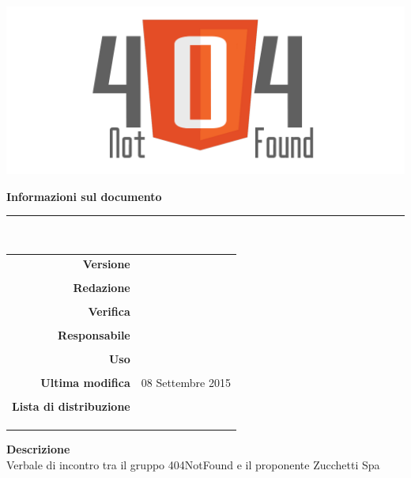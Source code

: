 \thispagestyle{empty}

\begin{titlepage}

	\begin{center}
	\begin{Huge}
		\textbf{\gruppo} \\
	\end{Huge}
	\vspace{0.5cm}
	\begin{Large}
		\textbf{\capitolato}
	\end{Large}
	
	\vspace{1cm}

	\includegraphics[scale=0.35]{../logo/logo404_Extends.png}
	\vspace{1cm}
	\begin{Huge}
		\textbf{\titDoc}
	\end{Huge}
	
	\vspace{1cm}
	\textbf{Informazioni sul documento}\\
	\rule{10cm}{.4pt} \\
	\begin{table}[h]
	\begin{center}
	\begin{tabular}{r | l}
		\textbf{Versione} & \versione \\ \\
		\textbf{Redazione} & \GoIs\\ \\
		\textbf{Verifica} & \MaMo \\ \\
		\textbf{Responsabile} & \CaMa \\ \\
		\textbf{Uso} & \uso \\ \\
		\textbf{Ultima modifica} & 08 Settembre 2015 \\ \\
		\textbf{Lista di distribuzione} & \gruppo \\ 
			& \Vardanega \\
			& \Cardin \\
			& \Zucchetti \\
	\end{tabular}
	\end{center}
	\end{table}
		\textbf{Descrizione} \\
		Verbale di incontro tra il gruppo 404NotFound e il proponente Zucchetti Spa
	\end{center}
\end{titlepage}